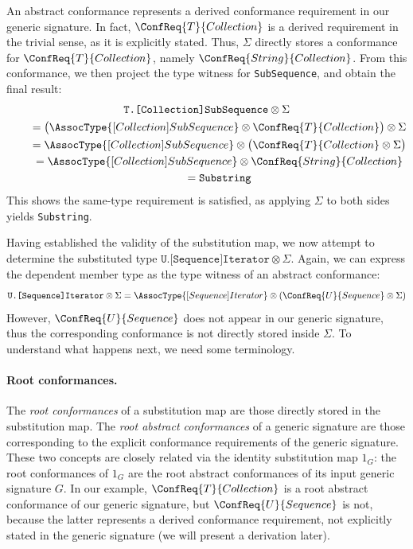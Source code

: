 \documentclass[../generics]{subfiles}
\begin{document}
An abstract conformance represents a derived conformance requirement in our generic signature. In fact, $\ConfReq{T}{Collection}$ is a derived requirement in the trivial sense, as it is explicitly stated. Thus, $\Sigma$ directly stores a conformance for $\ConfReq{T}{Collection}$, namely $\ConfReq{String}{Collection}$. From this conformance, we then project the type witness for \texttt{SubSequence}, and obtain the final result:
\begin{gather*}
\texttt{T.[Collection]SubSequence} \otimes \Sigma\\
\qquad {} = \bigl(\AssocType{[Collection]SubSequence} \otimes \ConfReq{T}{Collection}\bigr) \otimes \Sigma\\
\qquad {} = \AssocType{[Collection]SubSequence} \otimes \bigl(\ConfReq{T}{Collection} \otimes \Sigma\bigr)\\
\qquad {} = \AssocType{[Collection]SubSequence} \otimes \ConfReq{String}{Collection}\\
\qquad {} = \texttt{Substring}
\end{gather*}
This shows the same-type requirement is satisfied, as applying $\Sigma$ to both sides yields \texttt{Substring}.

Having established the validity of the substitution map, we now attempt to determine the substituted type $\texttt{U.[Sequence]Iterator} \otimes \Sigma$. Again, we can express the dependent member type as the type witness of an abstract conformance:
\[\texttt{U.[Sequence]Iterator} \otimes \Sigma = \AssocType{[Sequence]Iterator} \otimes (\ConfReq{U}{Sequence} \otimes \Sigma)\]
However, $\ConfReq{U}{Sequence}$ does not appear in our generic signature, thus the corresponding conformance is not directly stored inside $\Sigma$. To understand what happens next, we need some terminology. 

\paragraph{Root conformances.} The \emph{root conformances} of a substitution map are those directly stored in the substitution map. The \emph{root abstract conformances} of a generic signature are those corresponding to the explicit conformance requirements of the generic signature. These two concepts are closely related via the identity substitution map $1_G$: the root conformances of $1_G$ are the root abstract conformances of its input generic signature $G$. In our example, $\ConfReq{T}{Collection}$ is a root abstract conformance of our generic signature, but $\ConfReq{U}{Sequence}$ is not, because the latter represents a derived conformance requirement, not explicitly stated in the generic signature (we will present a derivation later).
\end{document}
